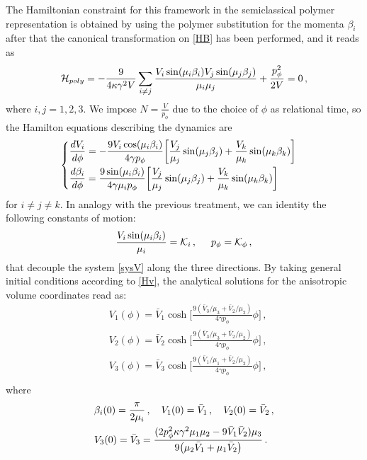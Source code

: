 \documentclass[aps,prd,twocolumn,nofootinbib,superscriptaddress]{revtex4-2}
\begin{document}
The Hamiltonian constraint for this framework in the semiclassical polymer representation is obtained by using the polymer substitution for the momenta $\beta_i$ after that the canonical transformation on \eqref{HB} has been performed, and it reads as
\begin{equation}
	\label{Hv}
	\mathcal{H}_{poly}=-{9\over{4\kappa\gamma^{2}V}}\sum_{i\neq j}{V_{i}\sin(\mu_{i}\beta_{i})V_{j}\sin(\mu_{j}\beta_{j})\over\mu_{i}\mu_{j}}+{p_{\phi}^{2}\over 2 V}=0\,,
\end{equation}
where $i,j=1,2,3$.
We impose $N=\frac{V}{p_\phi}$ due to the choice of $\phi$ as relational time, so the Hamilton equations describing the dynamics are
\begin{equation}
	\label{sysV}
	\begin{cases}
		\begin{aligned}
			&\frac{dV_i}{d\phi}=-{{9V_i\cos(\mu_i\beta_i)}\over 4\gamma p_{\phi}}\bigg[{V_j\over{\mu_j}}\sin(\mu_j\beta_j)+{V_k\over{\mu_k}}\sin(\mu_k\beta_k)\bigg]\\
			&\frac{d\beta_i}{d\phi}={9\sin(\mu_i\beta_i)\over{4\gamma\mu_ip_{\phi}}}\bigg[{V_j\over{\mu_j}}\sin(\mu_j\beta_j)+{V_k\over{\mu_k}}\sin(\mu_k\beta_k)\bigg]
		\end{aligned}
	\end{cases}
\end{equation}
for $i\neq j\neq k$. In analogy with the previous treatment, we can identity the following constants of motion:
\begin{equation}
	{V_{i}\sin(\mu_i\beta_i)\over{\mu_i}}=\mathcal{K}_{i}\,,\hspace{0.5cm}p_{\phi}=\mathcal{K}_{\phi}\,,
\end{equation}
that decouple the system \eqref{sysV}  along the three directions. By taking general initial conditions according to \eqref{Hv}, the analytical solutions for the anisotropic volume coordinates read as:
\begin{equation}
	\label{aniV}
	\begin{aligned}
		&V_1(\phi)=\bar{V}_1\cosh\Big[\frac{9(\bar{V}_3/\mu_3+\bar{V}_2/\mu_2)}{4\gamma p_\phi}\phi\Big]\,,\\
		&V_2(\phi)=\bar{V}_2\cosh\Big[\frac{9(\bar{V}_3/\mu_3+\bar{V}_2/\mu_2)}{4\gamma p_\phi}\phi\Big]\,,\\
		&V_3(\phi)=\bar{V}_3\cosh\Big[\frac{9(\bar{V}_1/\mu_1+\bar{V}_2/\mu_2)}{4\gamma p_\phi}\phi\Big]\,,\\
	\end{aligned}
\end{equation}
where 
\begin{equation}
	\label{condinVi}
	\begin{aligned}
		&\beta_i(0)={\pi\over 2 \mu_i}\,,\quad V_1(0)=\bar{V}_1\,,\quad V_2(0)=\bar{V}_2\,,\\
		&V_3(0)=\bar{V}_3=\frac{(2p_\phi^2\kappa\gamma^2\mu_1\mu_2-9\bar{V}_1\bar{V}_2)\mu_3}{9\big(\mu_2\bar{V}_1+\mu_1\bar{V}_2\big)}\,.
	\end{aligned}
\end{equation}
\end{document}
